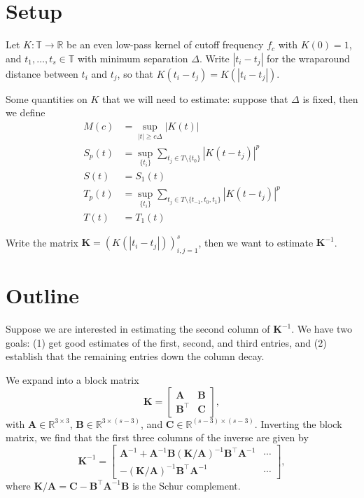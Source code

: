 \documentclass[11pt]{article}
\newcommand{\RR}{\mathbb{R}}
\newcommand{\TT}{\mathbb{T}}
\newcommand{\bA}{\bm A}
\newcommand{\bB}{\bm B}
\newcommand{\bC}{\bm C}
\newcommand{\bK}{\bm K}
\begin{document}
\noindent

\section{Setup}

Let $K: \TT \to \RR$ be an even low-pass kernel of cutoff frequency $f_c$ with $K(0) = 1$, and $t_1, \dots, t_s \in \TT$ with minimum separation $\Delta$.
Write $|t_i - t_j|$ for the wraparound distance between $t_i$ and $t_j$, so that $K(t_i - t_j) = K(|t_i - t_j|)$.

Some quantities on $K$ that we will need to estimate: suppose that $\Delta$ is fixed, then we define
\begin{align*}
  M(c) &= \sup_{|t| \geq c\Delta} |K(t)| \\
  S_p(t) &= \sup_{\{t_i\}} \sum_{t_j \in T \setminus \{t_0\}} |K(t - t_j)|^p \\
  S(t) &= S_1(t) \\
  T_p(t) &= \sup_{\{t_i\}} \sum_{t_j \in T \setminus \{t_{-1}, t_0, t_1\}} |K(t - t_j)|^p \\
  T(t) &= T_1(t)
\end{align*}

Write the matrix $\bK = (K(|t_i - t_j|))_{i, j = 1}^s$, then we want to estimate $\bK^{-1}$.

\section{Outline}

Suppose we are interested in estimating the second column of $\bK^{-1}$.
We have two goals: (1) get good estimates of the first, second, and third entries, and (2) establish that the remaining entries down the column decay.

We expand into a block matrix
\begin{equation}
    \bK = \left[ \begin{array}{cc} \bA & \bB \\ \bB^\top & \bC \end{array} \right],
\end{equation}
with $\bA \in \RR^{3 \times 3}$, $\bB \in \RR^{3 \times (s - 3)}$, and $\bC \in \RR^{(s - 3) \times (s - 3)}$.
Inverting the block matrix, we find that the first three columns of the inverse are given by
\begin{equation}
    \bK^{-1} = \left[ \begin{array}{cc} \bA^{-1} + \bA^{-1}\bB(\bK / \bA)^{-1}\bB^\top \bA^{-1} & \cdots \\ -(\bK / \bA)^{-1}\bB^\top \bA^{-1} & \cdots \end{array} \right],
\end{equation}
where $\bK / \bA = \bC - \bB^\top \bA^{-1} \bB$ is the Schur complement.
\end{document}

